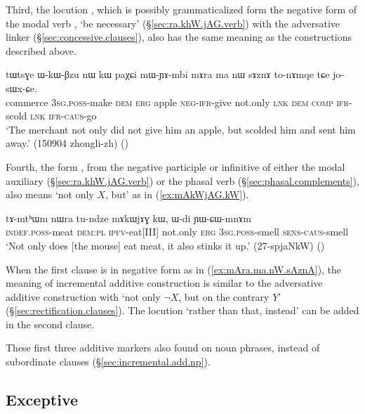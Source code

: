 Third, the locution , which is possibly grammaticalized form the negative form of the modal verb , `be necessary' (§\ref{sec:ra.khW.jAG.verb}) with the adversative linker  (§\ref{sec:concessive.clauses}), also has the same meaning as the constructions described above.

\begin{exe}
\ex \label{ex:mAra.ma.nW.sAznA}
\gll tɯtsɣe ɯ-kɯ-βzu nɯ kɯ paχɕi mɯ-ɲɤ-mbi mɤra ma nɯ sɤznɤ to-nɤmqe tɕe jo-sɯx-ɕe. \\
commerce \textsc{3sg}.\textsc{poss}-make \textsc{dem} \textsc{erg} apple \textsc{neg}-\textsc{ifr}-give not.only \textsc{lnk} \textsc{dem} \textsc{comp} \textsc{ifr}-scold \textsc{lnk} \textsc{ifr}-\textsc{caus}-go \\
\glt `The merchant not only did not give him an apple, but scolded him and sent him away.' (150904 zhongli-zh)
()
\end{exe}

Fourth, the form , from the negative participle or infinitive of either the modal auxiliary  (§\ref{sec:ra.khW.jAG.verb}) or the phasal verb  (§\ref{sec:phasal.complements}), also means `not only $X$, but' as in (\ref{ex:mAkWjAG.kW}).

 \begin{exe}
\ex \label{ex:mAkWjAG.kW}
\gll tɤ-mtʰɯm nɯra tu-ndze mɤkɯjɤɣ kɯ, ɯ-di ɲɯ-ɕɯ-mnɤm \\
\textsc{indef}.\textsc{poss}-meat \textsc{dem}:\textsc{pl} \textsc{ipfv}-eat[III] not.only \textsc{erg} \textsc{3sg}.\textsc{poss}-smell \textsc{sens}-\textsc{caus}-smell \\
\glt  `Not only does [the mouse] eat meat, it also stinks it up.' (27-spjaNkW)
()
\end{exe}


When the first clause is in negative form as in (\ref{ex:mAra.ma.nW.sAznA}), the meaning of incremental additive construction is similar to the adversative additive construction with  `not only $\neg X$, but on the contrary $Y$' (§\ref{sec:rectification.clauses}). The locution  `rather than that, instead' can be added in the second clause.

These first three additive markers also found on noun phrases, instead of subordinate clauses (§\ref{sec:incremental.add.np}).


\subsection{Exceptive} \label{sec:exceptive.clauses}

